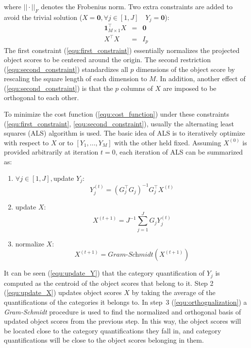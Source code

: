 \documentclass[a4paper]{article}
\begin{document}
where $||\cdot||_F$ denotes the Frobenius norm. Two extra constraints are added to avoid the trivial solution ($X=\mathbf{0}, \forall j\in [1,J]\quad Y_j=\mathbf{0}$):
\begin{eqnarray}
  \mathbf{1}_{M\times 1}^\top X&=&\mathbf{0}
  \label{equ:first_constraint} \\
  X^\top X&=&I_p
  \label{equ:second_constraint}
\end{eqnarray}
The first constraint (\ref{equ:first_constraint}) essentially normalizes the projected object scores to be centered around the origin.  
The second restriction (\ref{equ:second_constraint}) standardizes all $p$ dimensions of the object score by rescaling the square length of 
each dimension to $M$. In addition, another effect of (\ref{equ:second_constraint}) is that the $p$ columns of $X$ are imposed to be 
orthogonal to each other.   

To minimize the cost function (\ref{equ:cost_function}) under these constraints (\ref{equ:first_constraint}, \ref{equ:second_constraint}), usually 
the alternating least squares (ALS) algorithm \cite{gifi} is used. The basic idea of ALS is to iteratively optimize with respect to $X$ or 
to $[Y_1,\ldots,Y_M]$ with the other held fixed. Assuming $X^{(0)}$ is provided arbitrarily at iteration $t=0$, each iteration of ALS can be summarized as:    
\begin{enumerate}
    \item $\forall j\in[1,J],  $update $Y_j$: 
  \begin{equation}
    Y_j^{(t)}=(G_j^\top G_j)^{-1}G_j^{\top}X^{(t)}
    \label{equ:update_Y}
  \end{equation}
  \item update $X$:
    \begin{equation}
        X^{(t+1)}=J^{-1}\sum_{j=1}^{J}G_j Y_j^{(t)}
      \label{equ:update_X}
    \end{equation}
  \item normalize $X$: 
    \begin{equation}
    X^{(t+1)}=\textit{Gram-Schmidt}(X^{(t+1)})
    \label{equ:orthognalization}
  \end{equation}
\end{enumerate}
It can be seen (\ref{equ:update_Y}) that the category quantification of $Y_j$ is computed as the centroid of the object scores that belong to it. 
Step 2 (\ref{equ:update_X}) updates object scores $X$ 
by taking the average of the quantifications of the categories it belongs to. In step~3 (\ref{equ:orthognalization}) a \emph{Gram-Schmidt} procedure is used to find 
the normalized and orthogonal basis of updated object scores from the previous step. In this way, the object scores will be located close to the category 
quantifications they fall in, and category quantifications will be close to the object scores belonging in them.   
\end{document}
